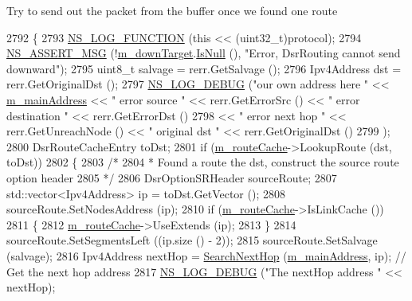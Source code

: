 Try to send out the packet from the buffer once we found one route 
\begin{DoxyCode}
2792 \{
2793   \hyperlink{log-macros-disabled_8h_a90b90d5bad1f39cb1b64923ea94c0761}{NS\_LOG\_FUNCTION} (\textcolor{keyword}{this} << (uint32\_t)protocol);
2794   \hyperlink{assert_8h_aff5ece9066c74e681e74999856f08539}{NS\_ASSERT\_MSG} (!\hyperlink{classns3_1_1dsr_1_1DsrRouting_aa1eb6ea60fdf9ba2cac2079a74ce1ca4}{m\_downTarget}.\hyperlink{classns3_1_1Callback_aa8e27826badbf37f84763f36f70d9b54}{IsNull} (), \textcolor{stringliteral}{"Error, DsrRouting cannot send
       downward"});
2795   uint8\_t salvage = rerr.GetSalvage ();
2796   Ipv4Address dst = rerr.GetOriginalDst ();
2797   \hyperlink{group__logging_ga413f1886406d49f59a6a0a89b77b4d0a}{NS\_LOG\_DEBUG} (\textcolor{stringliteral}{"our own address here "} << \hyperlink{classns3_1_1dsr_1_1DsrRouting_a73182b5edee2d8460f28855e058fc9a0}{m\_mainAddress} << \textcolor{stringliteral}{" error source "} << 
      rerr.GetErrorSrc () << \textcolor{stringliteral}{" error destination "} << rerr.GetErrorDst ()
2798                                         << \textcolor{stringliteral}{" error next hop "} << rerr.GetUnreachNode () << \textcolor{stringliteral}{" original dst "}
       << rerr.GetOriginalDst ()
2799                 );
2800   DsrRouteCacheEntry toDst;
2801   \textcolor{keywordflow}{if} (\hyperlink{classns3_1_1dsr_1_1DsrRouting_ac409bdb961b9fff0fb63ebd026be99ad}{m\_routeCache}->LookupRoute (dst, toDst))
2802     \{
2803       \textcolor{comment}{/*}
2804 \textcolor{comment}{       * Found a route the dst, construct the source route option header}
2805 \textcolor{comment}{       */}
2806       DsrOptionSRHeader sourceRoute;
2807       std::vector<Ipv4Address> ip = toDst.GetVector ();
2808       sourceRoute.SetNodesAddress (ip);
2810       \textcolor{keywordflow}{if} (\hyperlink{classns3_1_1dsr_1_1DsrRouting_ac409bdb961b9fff0fb63ebd026be99ad}{m\_routeCache}->IsLinkCache ())
2811         \{
2812           \hyperlink{classns3_1_1dsr_1_1DsrRouting_ac409bdb961b9fff0fb63ebd026be99ad}{m\_routeCache}->UseExtends (ip);
2813         \}
2814       sourceRoute.SetSegmentsLeft ((ip.size () - 2));
2815       sourceRoute.SetSalvage (salvage);
2816       Ipv4Address nextHop = \hyperlink{classns3_1_1dsr_1_1DsrRouting_aa1b16658c14499af76ca7dd69c034f22}{SearchNextHop} (\hyperlink{classns3_1_1dsr_1_1DsrRouting_a73182b5edee2d8460f28855e058fc9a0}{m\_mainAddress}, ip);       \textcolor{comment}{// Get the
       next hop address}
2817       \hyperlink{group__logging_ga413f1886406d49f59a6a0a89b77b4d0a}{NS\_LOG\_DEBUG} (\textcolor{stringliteral}{"The nextHop address "} << nextHop);

\end{DoxyCode}
